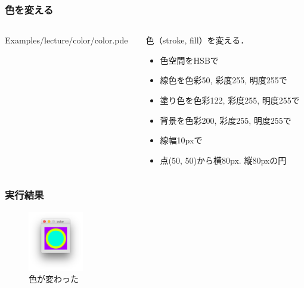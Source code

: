 \documentclass[10pt, dvipdfmx]{beamer}
\begin{document}
        \begin{frame}
            \frametitle{色を変える}
            \begin{columns}[c]
                \begin{column}{0.50\textwidth}
                    \tiny
                    Examples/lecture/color/color.pde
                    \scriptsize
                \end{column}
                \begin{column}{0.50\textwidth}
                    \begin{block}{色（stroke, fill）を変える．}
                        \begin{itemize}
                            \item 色空間をHSBで
                            \item 線色を色彩50, 彩度255, 明度255で
                            \item 塗り色を色彩122, 彩度255, 明度255で
                            \item 背景を色彩200, 彩度255, 明度255で
                            \item 線幅10pxで
                            \item 点(50, 50)から横80px. 縦80pxの円
                        \end{itemize}
                    \end{block}
                \end{column}
            \end{columns}
        \end{frame}

        \begin{frame}
            \frametitle{実行結果}
                \begin{figure}[htb]
                    \includegraphics[width=24mm]{images/09.png}
                    \caption{色が変わった}
                    \label{fig:09}
                \end{figure}
        \end{frame}
\end{document}

